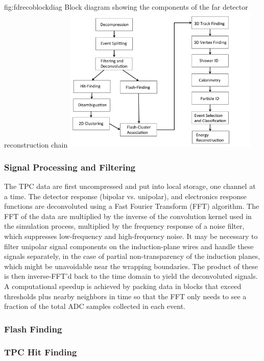 \begin{cdrfigure}{fig:fdrecoblockdiag}
{Block diagram showing the components of the far detector reconstruction chain}
\includegraphics[width=0.7\textwidth]{figures/fdrecoflowchart.pdf}
\end{cdrfigure}


\subsubsection{Signal Processing and Filtering}

The TPC data are first uncompressed and put into local storage, one
channel at a time.  The detector response (bipolar vs. unipolar), and
electronics response functions are deconvoluted using a Fast Fourier
Transform (FFT) algorithm.  The FFT of the data are multiplied by the
inverse of the convolution kernel used in the simulation process,
multiplied by the frequency response of a noise filter, which
suppresses low-frequency and high-frequency noise.  It may be
necessary to filter unipolar signal components on the induction-plane
wires and handle these signals separately, in the case of partial
non-transparency of the induction planes, which might be unavoidable
near the wrapping boundaries.  The product of these is then
inverse-FFT'd back to the time domain to yield the deconvoluted
signals.  A computational speedup is achieved by packing data in
blocks that exceed thresholds plus nearby neighbors in time so that
the FFT only needs to see a fraction of the total ADC samples
collected in each event.

\subsubsection{Flash Finding}


\subsubsection{TPC Hit Finding}

